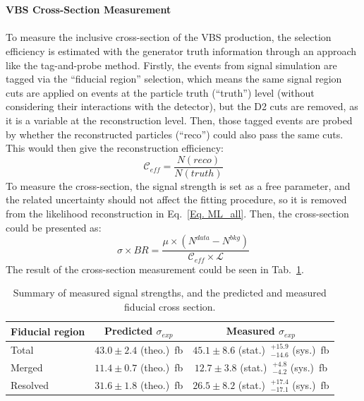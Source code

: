 \\
\\{\bf VBS Cross-Section Measurement}
\\
\\To measure the inclusive cross-section of the VBS production, the selection efficiency is estimated with the generator truth information through an approach like the tag-and-probe method. Firstly, the events from signal simulation are tagged via the ``fiducial region'' selection, which means the same signal region cuts are applied on events at the particle truth (``truth'') level (without considering their interactions with the detector), but the D2 cuts are removed, as it is a variable at the reconstruction level. Then, those tagged events are probed by whether the reconstructed particles (``reco'') could also pass the same cuts. This would then give the reconstruction efficiency:
\begin{equation}
\mathcal{C}_{eff} = \frac{N(reco)}{N(truth)} 
\end{equation}  
To measure the cross-section, the signal strength is set as a free parameter, and the related uncertainty should not affect the fitting procedure, so it is removed from the likelihood reconstruction in Eq.~\ref{Eq. ML_all}. Then, the cross-section could be presented as:
\begin{equation}
\sigma\times BR=\frac{\mu\times (N^{data}-N^{bkg})}{\mathcal{C}_{eff}\times\mathcal{L}}
\end{equation}
The result of the cross-section measurement could be seen in Tab.~\ref{tab:obs_mu_fidxs}.
\begin{table}[htb] 
	\centering
	\begin{tabular}{lcc}
		\hline
		Fiducial region  & Predicted $\sigma_{exp} $  & Measured $\sigma_{exp}$ \\
		\hline
		Total    & $43.0 \pm 2.4 $ (theo.)~fb  &  $45.1 \pm 8.6$ (stat.) $~^{+15.9}_{-14.6}$ (sys.)~fb \\
		Merged   & $11.4  \pm 0.7 $ (theo.)~fb  & $12.7 \pm 3.8$ (stat.) $~^{+4.8}_{-4.2}$ (sys.)~fb \\
		Resolved & $31.6 \pm 1.8 $ (theo.)~fb  &  $26.5 \pm 8.2$ (stat.) $~^{+17.4}_{-17.1}$ (sys.)~fb \\
		\hline 
	\end{tabular}
	\caption{Summary of measured signal strengths, and the predicted and measured fiducial cross section.
	}
	\label{tab:obs_mu_fidxs}  
\end{table}